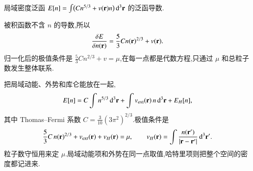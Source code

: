 \begin{example}
局域密度泛函 $E[n]=\int\bigl(C n^{5/3}+v({\mathbf{r}})n\bigr)\,\mathrm{d}^3{\mathbf{r}}$ 的泛函导数.
\end{example}
\begin{solution}
被积函数不含 $n$ 的导数,所以
\begin{equation}
  \frac{\delta {E}}{\delta {n({\mathbf{r}})}} = \frac{5}{3} C n({\mathbf{r}})^{2/3} + v({\mathbf{r}}).
\end{equation}
归一化后的极值条件是 $\tfrac{5}{3}C n^{2/3}+v=\mu$,在每一点都是代数方程,只通过 $\mu$ 和总粒子数发生整体联系.
\end{solution}

把局域动能、外势和库仑能放在一起,
\begin{equation}
  E[n] = C\int n^{5/3}\,\mathrm{d}^3{\mathbf{r}}
  + \int v_{\mathrm{ext}}({\mathbf{r}})\,n\,\mathrm{d}^3{\mathbf{r}}
  + E_H[n],
\end{equation}
其中 Thomas--Fermi 系数 $C=\frac{3}{10}(3\pi^2)^{2/3}$.极值条件是
\begin{equation}
  \frac{5}{3} C\, n({\mathbf{r}})^{2/3} + v_{\mathrm{ext}}({\mathbf{r}}) + v_H({\mathbf{r}}) = \mu,
  \qquad
  v_H({\mathbf{r}}) = \int \frac{n({\mathbf{r}^{\prime}})}{|{\mathbf{r}}-{\mathbf{r}^{\prime}}|}\,\mathrm{d}^3{\mathbf{r}^{\prime}}.
\end{equation}
粒子数守恒用来定 $\mu$.局域动能项和外势在同一点取值,哈特里项则把整个空间的密度都记进来.
